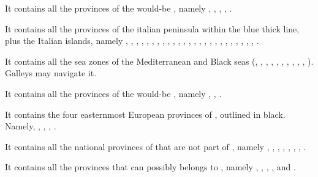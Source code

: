 \begin{deflist}
\item[\anchorregion{Irlande}] It contains all the provinces of the would-be
  , namely , ,
  , , .
\item[\anchorregion{Italie}] It contains all the provinces of the italian
  peninsula within the blue thick line, plus the Italian islands, namely
  , , ,
  , , ,
  , , , ,
  , , , ,
  , , , ,
  , , ,
  , , ,
  , .
\item[\anchorregion{Mediterranee}] It contains all the sea zones of the
  Mediterranean and Black seas (, ,
  , , ,
  , , ,
  , , ). Galleys may
  navigate it.
\item[\anchorregion{Norvege}] It contains all the provinces of the would-be
  , namely , ,
  .
\item[\anchorregion{Perse}] It contains the four easternmost European
  provinces of , outlined in black. Namely, ,
  , , .
\item[\anchorregion{Suede}] It contains all the national provinces of
   that are not part of , namely
  , , ,
  , , ,
  , .
\item[\anchorregion{Ukraine}] It contains all the provinces that can possibly
  belongs to , namely , ,
  , ,  and
  .
\end{deflist}


